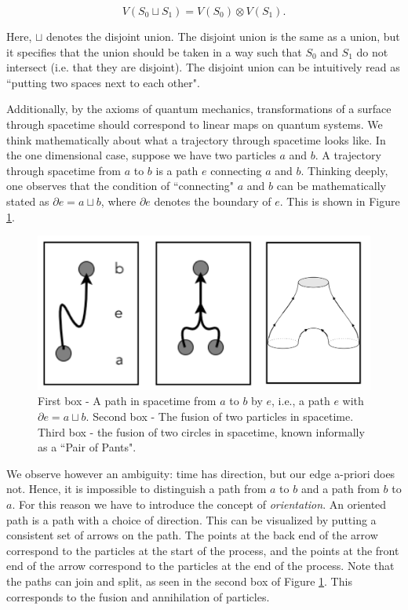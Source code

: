 \documentclass{article}
\theoremstyle{definition}
\numberwithin{figure}{section}
\begin{document}
$$V\left(S_0\sqcup S_1\right)=V(S_0)\otimes V(S_1).$$

Here, $\sqcup$ denotes the disjoint union. The disjoint union is the same as a union, but it specifies that the union should be taken in a way such that $S_0$ and $S_1$ do not intersect (i.e. that they are disjoint). The disjoint union can be intuitively read as  ``putting two spaces next to each other".

Additionally, by the axioms of quantum mechanics, transformations of a surface through spacetime should correspond to linear maps on quantum systems. We think mathematically about what a trajectory through spacetime looks like. In the one dimensional case, suppose we have two particles $a$ and $b$. A trajectory through spacetime from $a$ to $b$ is a path $e$ connecting $a$ and $b$. Thinking deeply, one observes that the condition of ``connecting" $a$ and $b$ can be mathematically stated as $\partial e= a \sqcup b$, where $\partial e$ denotes the boundary of $e$. This is shown in Figure \ref{fig:bordism}.

\begin{figure}
\begin{center}
\includegraphics[scale=0.40]{cobordism}
\caption{First box - A path in spacetime from $a$ to $b$ by $e$, i.e., a path $e$ with $\partial e= a \sqcup b$. Second box - The fusion of two particles in spacetime. Third box - the fusion of two circles in spacetime, known informally as a ``Pair of Pants".}
\label{fig:bordism}
\end{center}
\end{figure}

We observe however an ambiguity: time has direction, but our edge a-priori does not. Hence, it is impossible to distinguish a path from $a$ to $b$ and a path from $b$ to $a$. For this reason we have to introduce the concept of \textit{orientation}. An oriented path is a path with a choice of direction. This can be visualized by putting a consistent set of arrows on the path. The points at the back end of the arrow correspond to the particles at the start of the process, and the points at the front end of the arrow correspond to the particles at the end of the process. Note that the paths can join and split, as seen in the second box of Figure \ref{fig:bordism}. This corresponds to the fusion and annihilation of particles.
\end{document}
